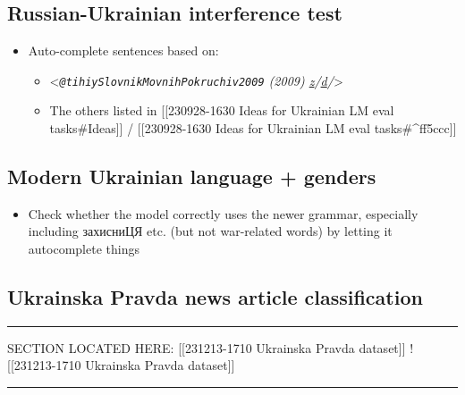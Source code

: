 \subsection{Russian-Ukrainian interference
test}\label{russian-ukrainian-interference-test}

\begin{itemize}
\tightlist
\item
  Auto-complete sentences based on:

  \begin{itemize}
  \tightlist
  \item
    \textless{}\emph{\texttt{@tihiySlovnikMovnihPokruchiv2009} (2009)
    \href{zotero://select/items/@tihiySlovnikMovnihPokruchiv2009}{z}/\href{https://doi.org/}{d}/\href{}{}}\textgreater{}
  \item
    The others listed in {[}{[}230928-1630 Ideas for Ukrainian LM eval
    tasks\#Ideas{]}{]} / {[}{[}230928-1630 Ideas for Ukrainian LM eval
    tasks\#\^{}ff5ccc{]}{]}
  \end{itemize}
\end{itemize}

\subsection{Modern Ukrainian language +
genders}\label{modern-ukrainian-language--genders}

\begin{itemize}
\tightlist
\item
  Check whether the model correctly uses the newer grammar, especially
  including захисниЦЯ etc. (but not war-related words)
  \cite{synchak2023feminine} by letting it autocomplete things
\end{itemize}

\subsection{Ukrainska Pravda news article
classification}\label{ukrainska-pravda-news-article-classification}

\begin{center}\rule{0.5\linewidth}{0.5pt}\end{center}

SECTION LOCATED HERE: {[}{[}231213-1710 Ukrainska Pravda dataset{]}{]}
!{[}{[}231213-1710 Ukrainska Pravda dataset{]}{]}

\begin{center}\rule{0.5\linewidth}{0.5pt}\end{center}

